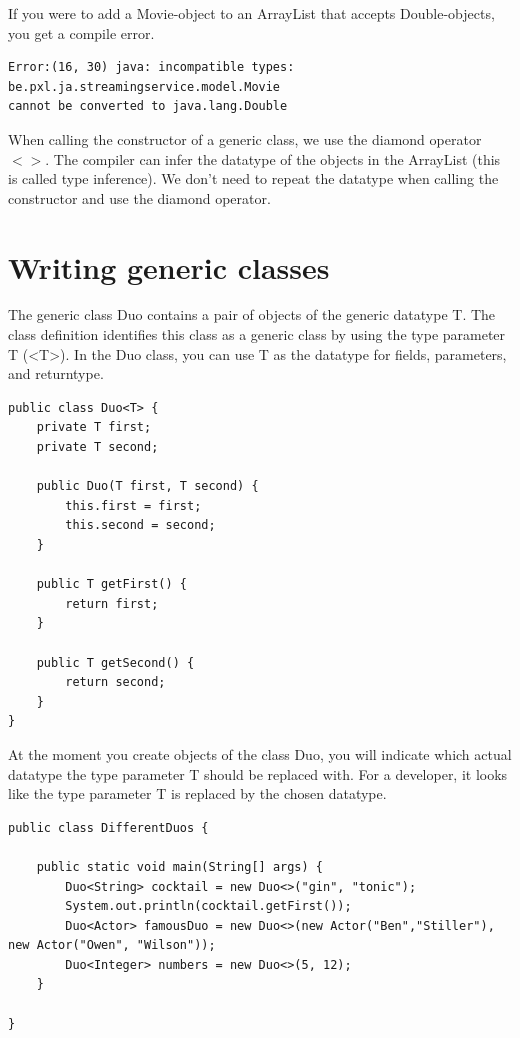 If you were to add a Movie-object to an ArrayList that accepts Double-objects, you get a compile error.

\begin{verbatim}
Error:(16, 30) java: incompatible types: be.pxl.ja.streamingservice.model.Movie 
cannot be converted to java.lang.Double
\end{verbatim}

When calling the constructor of a generic class, we use the diamond operator $<>$. The compiler can infer the datatype of the objects in the ArrayList (this is called type inference).  We don't need to repeat the datatype when calling the constructor and use the diamond operator.


\section{Writing generic classes}

The generic class Duo  contains a pair of objects of the generic datatype T.  The class definition identifies this class as a generic class by using the type parameter T (<T>).  In the Duo class, you can use T as the datatype for fields,  parameters,  and returntype.

\begin{lstlisting}
public class Duo<T> {
	private T first;
	private T second;

	public Duo(T first, T second) {
		this.first = first;
		this.second = second;
	}

	public T getFirst() {
		return first;
	}

	public T getSecond() {
		return second;
	}
}
\end{lstlisting}

At the moment you create objects of the class Duo,  you will indicate which actual datatype the type parameter T should be replaced with.  For a developer, it looks like the type parameter T is replaced by the chosen datatype.


\begin{lstlisting}
public class DifferentDuos {

	public static void main(String[] args) {
		Duo<String> cocktail = new Duo<>("gin", "tonic");
		System.out.println(cocktail.getFirst());
		Duo<Actor> famousDuo = new Duo<>(new Actor("Ben","Stiller"), new Actor("Owen", "Wilson"));
		Duo<Integer> numbers = new Duo<>(5, 12);
	}

}
\end{lstlisting}

